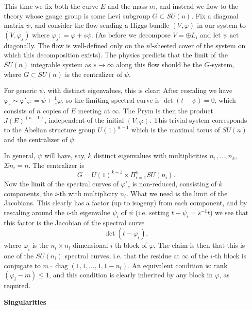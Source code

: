 This time we fix both the curve $E$ and the mass $m$, and
instead we flow to the theory whose gauge group 
is some Levi subgroup
$G\subset SU(n)$.  Fix a diagonal matrix $\psi$, 
and consider the flow
sending a Higgs bundle $(V,\varphi)$ in our system 
to $(V,\varphi_s)$ where
$\varphi_s: = \varphi+s\psi$.  (As before we 
decompose $V = \oplus L_i$ and
let $\psi$ act diagonally.  The flow is 
well-defined only on the 
$n!$-sheeted cover of the system on which this 
decomposition exists).  The
physics predicts that the limit of the $SU(n)$
integrable system  as $s\to\infty$ along this 
flow should be the $G$-system, where $G\subset SU(n)$ 
is the 
centralizer of $\psi$.

For generic $\psi$, with distinct eigenvalues, this 
is clear:  After 
rescaling we have
$\varphi_s\sim\varphi'_s: = \psi + \frac1s\varphi$, 
so the 
limiting spectral curve is $\det(t-\psi) = 0$, which 
consists of $n$
copies of $E$ meeting at $\infty$.  The Prym is 
then the product
$J(E)^{(n-1)}$, independent of the initial 
$(V,\varphi)$.  This trivial
system corresponds to the Abelian structure 
group $U(1)^{n-1}$ which
is the maximal torus of $SU(n)$ and the 
centralizer of $\psi$.  

In general, 
$\psi$ will have, say, $k$ distinct 
eigenvalues with multiplicities $n_1,
\dotsc, n_k$, 
$\Sigma n_i = n$.  The 
centralizer is
$$
G = U(1)^{k-1}\times\Pi^k_{i=1} SU(n_i).
$$
Now the limit of the spectral curves of 
$\varphi'_s$ is non-reduced, consisting of 
$k$ components, the $i$-th with multiplicity 
$n_i$.  What we need is the
limit of the Jacobians.  This clearly has a 
factor (up to isogeny) from 
each component, and by rescaling around 
the $i$-th eigenvalue $\psi_i$ of
$\psi$ (i.e. setting $t-\psi_i = s^{-1}\tilde t$) 
we see that this 
factor is the Jacobian of the spectral curve
$$
\det(\tilde t-\varphi_i),
$$
where $\varphi_i$ is the $n_i\times n_i$ 
dimensional $i$-th block of $\varphi$.  
The claim is then
that this is one of the $SU(n_i)$ spectral 
curves, i.e. that the residue at
$\infty$ of the $i$-th block is 
conjugate to $m\cdot\text{ diag }(1,1,\dotsc, 1,1-n_i)$.  
An equivalent condition is: 
rank $(\varphi_i-m)\le 1$, and this
condition is clearly inherited by any 
block in $\varphi$, as required.

\medskip\noindent
{\bf Singularities}

